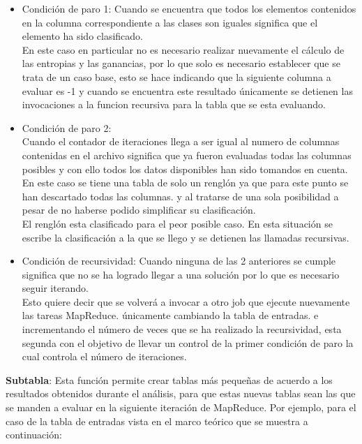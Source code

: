\begin{itemize}
	\item Condición de paro 1:
	Cuando se encuentra que todos los elementos contenidos en la columna correspondiente a las clases son iguales significa que el elemento ha sido clasificado.\\
	En este caso en particular no es necesario realizar nuevamente el cálculo de las entropias y las ganancias, por lo que solo es necesario establecer que se trata de un caso base, esto se hace indicando que la siguiente columna a evaluar es -1 y cuando se encuentra este resultado únicamente se detienen las invocaciones a la funcion recursiva para la tabla que se esta evaluando.\\
	\item Condición de paro 2: \\
	Cuando el contador de iteraciones llega a ser igual al numero de columnas contenidas en el archivo significa que ya fueron evaluadas todas las columnas posibles y con ello todos los datos disponibles han sido tomandos en cuenta.\\
	En este caso se tiene una tabla de solo un renglón ya que para este punto se han descartado todas las columnas. y al tratarse de una sola posibilidad a pesar de no haberse podido simplificar su clasificación.\\ 
	El renglón esta clasificado para el peor posible caso. En esta situación se escribe la clasificación a la que se llego y se detienen las llamadas recursivas.\\
	\item Condición de recursividad: Cuando ninguna de las 2 anteriores se cumple significa que no se ha logrado llegar a una solución por lo que es necesario seguir iterando.\\
	Esto quiere decir que se volverá a invocar a otro job que ejecute nuevamente las tareas MapReduce. únicamente cambiando la tabla de entradas. e incrementando el número de veces que se ha realizado la recursividad, esta segunda con el objetivo de llevar un control de la primer condición de paro la cual controla el número de iteraciones. \\ 
\end{itemize}
\textbf{Subtabla}: Esta función permite crear tablas más pequeñas de acuerdo a los resultados obtenidos durante el análisis, para que estas nuevas tablas sean las que se manden a evaluar en la siguiente iteración de MapReduce.
Por ejemplo, para el caso de la tabla de entradas vista en el marco teórico que se muestra a continuación:
